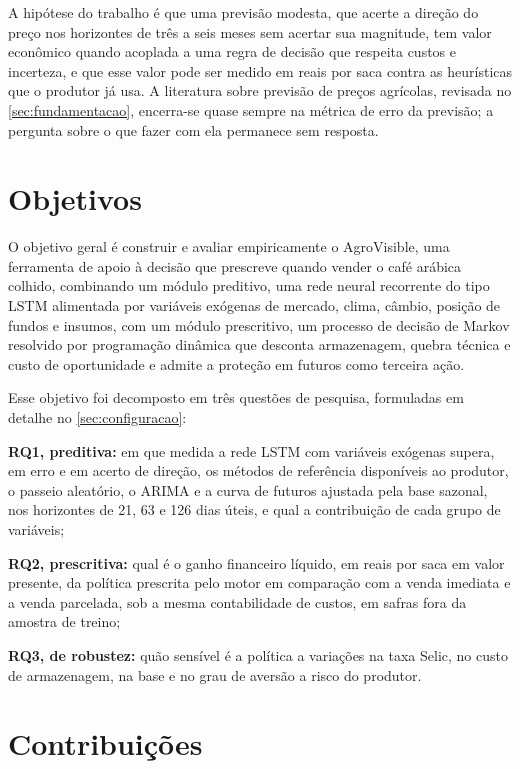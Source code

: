 A hipótese do trabalho é que uma previsão modesta, que acerte a direção do preço nos horizontes de três a seis meses sem acertar sua magnitude, tem valor econômico quando acoplada a uma regra de decisão que respeita custos e incerteza, e que esse valor pode ser medido em reais por saca contra as heurísticas que o produtor já usa. A literatura sobre previsão de preços agrícolas, revisada no \autoref{sec:fundamentacao}, encerra-se quase sempre na métrica de erro da previsão; a pergunta sobre o que fazer com ela permanece sem resposta.

\section{Objetivos}

O objetivo geral é construir e avaliar empiricamente o AgroVisible, uma ferramenta de apoio à decisão que prescreve quando vender o café arábica colhido, combinando um módulo preditivo, uma rede neural recorrente do tipo LSTM alimentada por variáveis exógenas de mercado, clima, câmbio, posição de fundos e insumos, com um módulo prescritivo, um processo de decisão de Markov resolvido por programação dinâmica que desconta armazenagem, quebra técnica e custo de oportunidade e admite a proteção em futuros como terceira ação.

Esse objetivo foi decomposto em três questões de pesquisa, formuladas em detalhe no \autoref{sec:configuracao}:

\begin{alineas}
	\item \textbf{RQ1, preditiva:} em que medida a rede LSTM com variáveis exógenas supera, em erro e em acerto de direção, os métodos de referência disponíveis ao produtor, o passeio aleatório, o ARIMA e a curva de futuros ajustada pela base sazonal, nos horizontes de 21, 63 e 126 dias úteis, e qual a contribuição de cada grupo de variáveis;
	\item \textbf{RQ2, prescritiva:} qual é o ganho financeiro líquido, em reais por saca em valor presente, da política prescrita pelo motor em comparação com a venda imediata e a venda parcelada, sob a mesma contabilidade de custos, em safras fora da amostra de treino;
	\item \textbf{RQ3, de robustez:} quão sensível é a política a variações na taxa Selic, no custo de armazenagem, na base e no grau de aversão a risco do produtor.
\end{alineas}

\section{Contribuições}

